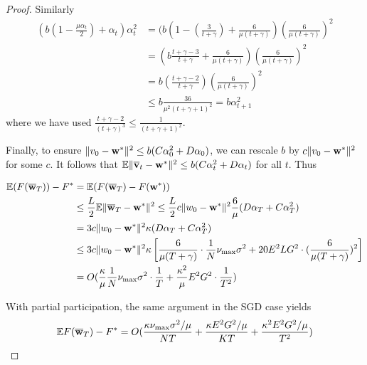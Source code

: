 \begin{proof}
Similarly 
\begin{align*}
(b(1-\frac{\mu\alpha_{t}}{2})+\alpha_{t})\alpha_{t}^{2} & =(b(1-(\frac{3}{t+\gamma})+\frac{6}{\mu(t+\gamma)})(\frac{6}{\mu(t+\gamma)})^{2}\\
& =(b\frac{t+\gamma-3}{t+\gamma}+\frac{6}{\mu(t+\gamma)})(\frac{6}{\mu(t+\gamma)})^{2}\\
& =b(\frac{t+\gamma-2}{t+\gamma})(\frac{6}{\mu(t+\gamma)})^{2}\\
& \leq b\frac{36}{\mu^{2}(t+\gamma+1)^{2}}=b\alpha_{t+1}^{2}
\end{align*}
where we have used $\frac{t+\gamma-2}{(t+\gamma)^{3}}\leq\frac{1}{(t+\gamma+1)^{2}}$.

Finally, to ensure $\|v_{0}-{\mathbf{w}}^{\ast}\|^{2}\leq b(C\alpha_{0}^{2}+D\alpha_{0})$,
we can rescale $b$ by $c\|v_{0}-{\mathbf{w}}^{\ast}\|^{2}$ for some $c.$ It
follows that $\mathbb{E}\|{\overline{\mathbf{v}}}_{t}-{\mathbf{w}}^{\ast}\|^{2}\leq b(C\alpha_{t}^{2}+D\alpha_{t})$
for all $t$. Thus 

\begin{align*}
\mathbb{E}(F({\overline{\mathbf{w}}}_{T}))-F^{\ast} & =\mathbb{E}(F({\overline{\mathbf{w}}}_{T})-F({\mathbf{w}}^{\ast}))\\
& \leq\frac{L}{2}\mathbb{E}\|{\overline{\mathbf{w}}}_{T}-{\mathbf{w}}^{\ast}\|^{2}\leq\frac{L}{2}c\|w_{0}-{\mathbf{w}}^{\ast}\|^{2}\frac{6}{\mu}(D\alpha_{T}+C\alpha_{T}^{2})\\
& =3c\|w_{0}-{\mathbf{w}}^{\ast}\|^{2}\kappa(D\alpha_{T}+C\alpha_{T}^{2})\\
& \leq3c\|w_{0}-{\mathbf{w}}^{\ast}\|^{2}\kappa\left[\frac{6}{\mu(T+\gamma)}\cdot\frac{1}{N}\nu_{\max}\sigma^{2}+20E^{2}LG^{2}\cdot(\frac{6}{\mu(T+\gamma)})^{2}\right]\\
& =O(\frac{\kappa}{\mu}\frac{1}{N}\nu_{\max}\sigma^{2}\cdot\frac{1}{T}+\frac{\kappa^{2}}{\mu}E^{2}G^{2}\cdot\frac{1}{T^{2}})
\end{align*}

With partial participation, the same argument in the SGD case yields
\begin{align*}
\mathbb{E}F({\overline{\mathbf{w}}}_{T})-F^{\ast}=O(\frac{\kappa\nu_{\max}\sigma^{2}/\mu}{NT}+\frac{\kappa E^{2}G^{2}/\mu}{KT}+\frac{\kappa^{2}E^{2}G^{2}/\mu}{T^{2}})
\end{align*}
\end{proof}